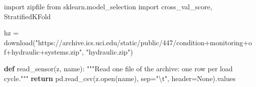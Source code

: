 \documentclass[
  letterpaper,
  DIV=11,
  numbers=noendperiod]{scrreprt}
\newenvironment{Shaded}{\begin{snugshade}}{\end{snugshade}}
\newcommand{\BuiltInTok}[1]{\textcolor[rgb]{0.00,0.23,0.31}{#1}}
\newcommand{\CharTok}[1]{\textcolor[rgb]{0.13,0.47,0.30}{#1}}
\newcommand{\CommentTok}[1]{\textcolor[rgb]{0.37,0.37,0.37}{#1}}
\newcommand{\ControlFlowTok}[1]{\textcolor[rgb]{0.00,0.23,0.31}{\textbf{#1}}}
\newcommand{\ImportTok}[1]{\textcolor[rgb]{0.00,0.46,0.62}{#1}}
\newcommand{\KeywordTok}[1]{\textcolor[rgb]{0.00,0.23,0.31}{\textbf{#1}}}
\newcommand{\NormalTok}[1]{\textcolor[rgb]{0.00,0.23,0.31}{#1}}
\newcommand{\OperatorTok}[1]{\textcolor[rgb]{0.37,0.37,0.37}{#1}}
\newcommand{\StringTok}[1]{\textcolor[rgb]{0.13,0.47,0.30}{#1}}
\newcommand{\VariableTok}[1]{\textcolor[rgb]{0.07,0.07,0.07}{#1}}
\begin{document}
\begin{tcolorbox}[enhanced jigsaw, left=2mm, title=\textcolor{quarto-callout-caution-color}{\faFire}\hspace{0.5em}{Solution to Exercise 4}, opacityback=0, breakable, rightrule=.15mm, arc=.35mm, toptitle=1mm, colbacktitle=quarto-callout-caution-color!10!white, opacitybacktitle=0.6, coltitle=black, colframe=quarto-callout-caution-color-frame, bottomrule=.15mm, leftrule=.75mm, bottomtitle=1mm, titlerule=0mm, toprule=.15mm, colback=white]

\begin{Shaded}
\begin{Highlighting}[]
\ImportTok{import}\NormalTok{ zipfile}
\ImportTok{from}\NormalTok{ sklearn.model\_selection }\ImportTok{import}\NormalTok{ cross\_val\_score, StratifiedKFold}

\NormalTok{hz }\OperatorTok{=}\NormalTok{ download(}\StringTok{"https://archive.ics.uci.edu/static/public/447/condition+monitoring+of+hydraulic+systems.zip"}\NormalTok{,}
              \StringTok{"hydraulic.zip"}\NormalTok{)}

\KeywordTok{def}\NormalTok{ read\_sensor(z, name):}
    \CommentTok{"""Read one file of the archive: one row per load cycle."""}
    \ControlFlowTok{return}\NormalTok{ pd.read\_csv(z.}\BuiltInTok{open}\NormalTok{(name), sep}\OperatorTok{=}\StringTok{"}\CharTok{\textbackslash{}t}\StringTok{"}\NormalTok{, header}\OperatorTok{=}\VariableTok{None}\NormalTok{).values}


\end{Highlighting}
\end{Shaded}
\end{tcolorbox}
\end{document}
